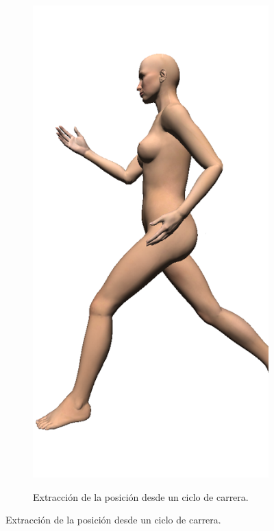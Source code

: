 \begin{figure}[ht]
\begin{subfigure}[b]{0.32\linewidth}
    \end{subfigure}
    \null\hfill
     \begin{subfigure}[b]{0.32\linewidth}
        \centering
        {\includegraphics[width=\linewidth]{IMG/Pose3.png}}
        \caption{Extracción de la posición desde un ciclo de carrera. \label{subfig:animacion}}

\end{subfigure}
\end{figure}
